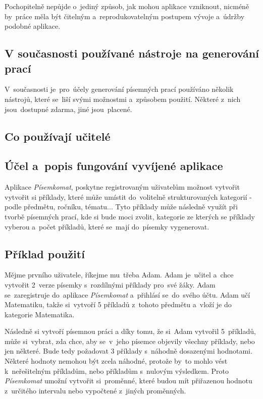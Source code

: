 \documentclass[14pt,a4paper]{article}
\begin{document}
    Pochopitelně nepůjde o~jediný způsob, jak mohou aplikace vzniknout, nicméně by~práce měla být čitelným a~reprodukovatelným postupem vývoje
    a~údržby podobné aplikace.
        
        \subsection{V současnosti používané nástroje na generování prací}
        V~současnosti je~pro~účely generování písemných prací používáno několik nástrojů, které se~liší svými možnostmi a~způsobem použití.
        Některé z~nich jsou~dostupné zdarma, jiné jsou~placené.
        
        \subsection{Co používají učitelé}

        \subsection{Účel a~popis fungování vyvíjené aplikace}
        Aplikace \emph{Písemkomat}, poskytne registrovaným uživatelům možnost vytvořit vytvořit si příklady, které může umístit do~volitelně
        strukturovaných kategorií - podle předmětu, ročníku, tématu... Tyto příklady může následně využít při tvorbě písemných prací,
        kde si bude moci zvolit, kategorie ze kterých se příklady vyberou a~počet příkladů, které se~mají do~písemky vygenerovat. 
        \subsection{Příklad použití}
        Mějme prvního uživatele, říkejme mu~třeba Adam. Adam je~učitel a~chce vytvořit 2~verze písemky s~rozdílnými příklady pro~své žáky.
        Adam se~zaregistruje do~aplikace \emph{Písemkomat} a~přihlásí se~do~svého účtu. Adam učí Matematiku, takže si~vytvoří 5 příkladů z~tohoto předmětu
        a~vloží je do kategorie Matematika.

        Následně si vytvoří písemnou práci a díky tomu, že si~Adam vytvořil 5~příkladů, může si~vybrat, zda chce,
        aby se~v~jeho písemce objevily všechny příklady, nebo jen některé. Bude tedy požadovat 3 příklady s~náhodně dosazenými hodnotami.
        Některé hodnoty nemohou být zcela náhodné, protože by~to mohlo vést k~neřešitelným příkladům, nebo příkladům s~nulovým výsledkem.
        Proto \emph{Písemkomat} umožní vytvořit si~proměnné, které budou mít přiřazenou hodnotu z~určitého intervalu nebo vypočtené z~jiných proměnných.
\end{document}
